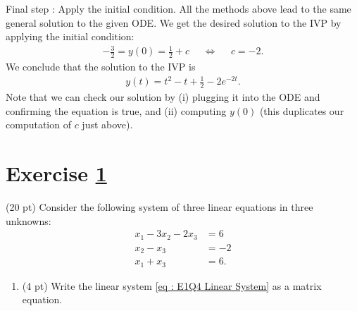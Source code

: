 {Final step : Apply the initial condition. All the methods above lead to the same general solution to the given ODE. We get the desired solution to the IVP by applying the initial condition:
\begin{align*}
-\frac{3}{2}
=
y(0)
=
\frac{1}{2} + c
&&
\Leftrightarrow
&&
c
=
-2.
\end{align*}
We conclude that the solution to the IVP is
\begin{align*}
y(t)
=
t^{2} - t + \frac{1}{2} - 2 e^{-2 t}.
\end{align*}
Note that we can check our solution by (i) plugging it into the ODE and confirming the equation is true, and (ii) computing $y(0)$ (this duplicates our computation of $c$ just above).}%





%
%
%
%


\section{Exercise \ref{sec : Math211 Summer2019 Exam2 Q4}}
\label{sec : Math211 Summer2019 Exam2 Q4}

(20 pt) Consider the following system of three linear equations in three unknowns:
\begin{align}
x_{1} - 3 x_{2} - 2 x_{3}
&=
6%
\nonumber
\\
x_{2} - x_{3}
&=
-2%
\label{eq : E1Q4 Linear System}
\\
x_{1} + x_{3}
&=
6.%
\nonumber
\end{align}
\begin{enumerate}[label=(\alph*)]
\item\label{itm : E2Q4a} (4 pt) Write the linear system \eqref{eq : E1Q4 Linear System} as a matrix equation. 
\end{enumerate}

